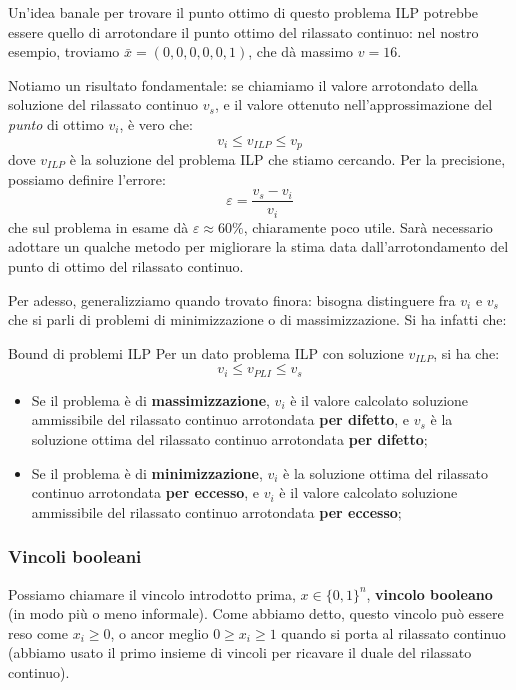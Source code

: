 \documentclass[a4paper,11pt]{article}
\begin{document}
Un'idea banale per trovare il punto ottimo di questo problema ILP potrebbe essere quello di arrotondare il punto ottimo del rilassato continuo: nel nostro esempio, troviamo $\bar{x} = \left( 0, 0, 0, 0, 0, 1 \right)$, che dà massimo $v = 16$.

Notiamo un risultato fondamentale: se chiamiamo il valore arrotondato della soluzione del rilassato continuo $v_s$, e il valore ottenuto nell'approssimazione del \textit{punto} di ottimo $v_i$, è vero che:
$$ v_i \leq v_{ILP} \leq v_p $$
dove $v_{ILP}$ è la soluzione del problema ILP che stiamo cercando.
Per la precisione, possiamo definire l'errore:
$$
\varepsilon = \frac{v_s - v_i}{v_i}
$$
che sul problema in esame dà $\varepsilon \approx 60\%$, chiaramente poco utile. 
Sarà necessario adottare un qualche metodo per migliorare la stima data dall'arrotondamento del punto di ottimo del rilassato continuo.

Per adesso, generalizziamo quando trovato finora: bisogna distinguere fra $v_i$ e $v_s$ che si parli di problemi di minimizzazione o di massimizzazione.
Si ha infatti che:
\begin{theorem}{Bound di problemi ILP}
	Per un dato problema ILP con soluzione $v_{ILP}$, si ha che:
	$$
		v_i \leq v_{PLI} \leq v_s
	$$
	\begin{itemize}
		\item Se il problema è di \textbf{massimizzazione}, $v_i$ è il valore calcolato soluzione ammissibile del rilassato continuo arrotondata \textbf{per difetto}, e $v_s$ è la soluzione ottima del rilassato continuo arrotondata \textbf{per difetto};
		\item Se il problema è di \textbf{minimizzazione}, $v_i$ è la soluzione ottima del rilassato continuo arrotondata \textbf{per eccesso}, e $v_i$ è il valore calcolato soluzione ammissibile del rilassato continuo arrotondata \textbf{per eccesso};
	\end{itemize}
\end{theorem}

\subsubsection{Vincoli booleani}
Possiamo chiamare il vincolo introdotto prima, $x \in \{ 0, 1 \}^n$, \textbf{vincolo booleano} (in modo più o meno informale).
Come abbiamo detto, questo vincolo può essere reso come $x_i \geq 0$, o ancor meglio $0 \geq x_i \geq 1$ quando si porta al rilassato continuo (abbiamo usato il primo insieme di vincoli per ricavare il duale del rilassato continuo).
\end{document}
